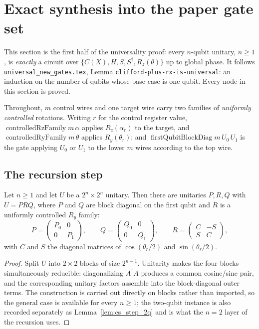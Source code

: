 \section{Exact synthesis into the paper gate set}
\label{sec:exact}

This section is the first half of the universality proof: every $n$-qubit
unitary, $n \ge 1$, is \emph{exactly} a circuit over
$\{C(X), H, S, S^\dagger, R_z(\theta)\}$ up to global phase.  It follows
\texttt{universal\_new\_gates.tex}, Lemma
\texttt{clifford-plus-rx-is-universal}: an induction on the number of qubits
whose base case is one qubit.  Every node in this section is proved.

Throughout, $m$ control wires and one target wire carry two families of
\emph{uniformly controlled} rotations.  Writing $r$ for the control register
value, $\operatorname{controlledRzFamily} m\, \alpha$ applies
$R_z(\alpha_r)$ to the target, and $\operatorname{controlledRyFamily} m\, \theta$
applies $R_y(\theta_r)$; and $\operatorname{firstQubitBlockDiag} m\, U_0\, U_1$
is the gate applying $U_0$ or $U_1$ to the lower $m$ wires according to the top
wire.

\subsection{The recursion step}

\begin{lemma}
  \label{lem:cs_step}
  \leanok
  Let $n \ge 1$ and let $U$ be a $2^n \times 2^n$ unitary.  Then there are
  unitaries $P, R, Q$ with $U = P R Q$, where $P$ and $Q$ are block diagonal on
  the first qubit and $R$ is a uniformly controlled $R_y$ family:
  \[
    P = \begin{pmatrix} P_0 & 0 \\ 0 & P_1\end{pmatrix},\qquad
    Q = \begin{pmatrix} Q_0 & 0 \\ 0 & Q_1\end{pmatrix},\qquad
    R = \begin{pmatrix} C & -S \\ S & C \end{pmatrix},
  \]
  with $C$ and $S$ the diagonal matrices of $\cos(\theta_r/2)$ and
  $\sin(\theta_r/2)$.
\end{lemma}

\begin{proof}
  \leanok
  Split $U$ into $2 \times 2$ blocks of size $2^{n-1}$.  Unitarity makes the
  four blocks simultaneously reducible: diagonalizing $A^\dagger A$ produces a
  common cosine/sine pair, and the corresponding unitary factors assemble into
  the block-diagonal outer terms.  The construction is carried out directly on
  blocks rather than imported, so the general case is available for every
  $n \ge 1$; the two-qubit instance is also recorded separately as
  Lemma~\ref{lem:cs_step_2q} and is what the $n = 2$ layer of the recursion
  uses.
\end{proof}


